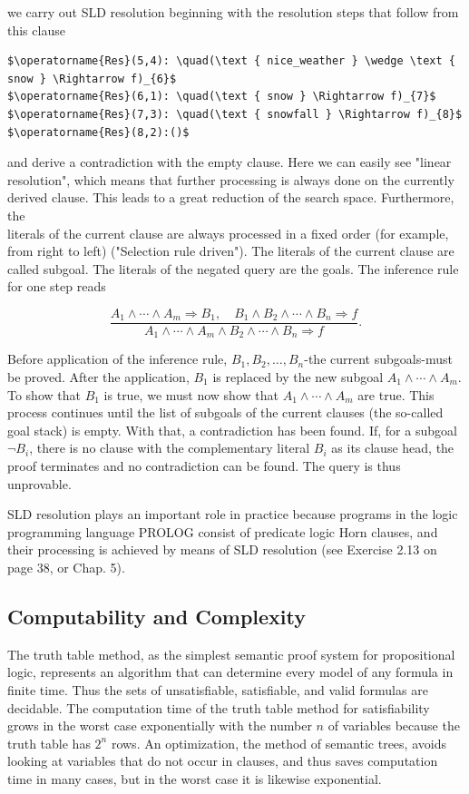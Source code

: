 \documentclass[10pt]{book}
\begin{document}
we carry out SLD resolution beginning with the resolution steps that follow from this clause

\begin{verbatim}
$\operatorname{Res}(5,4): \quad(\text { nice_weather } \wedge \text { snow } \Rightarrow f)_{6}$
$\operatorname{Res}(6,1): \quad(\text { snow } \Rightarrow f)_{7}$
$\operatorname{Res}(7,3): \quad(\text { snowfall } \Rightarrow f)_{8}$
$\operatorname{Res}(8,2):()$
\end{verbatim}

and derive a contradiction with the empty clause. Here we can easily see "linear resolution", which means that further processing is always done on the currently derived clause. This leads to a great reduction of the search space. Furthermore, the\\

literals of the current clause are always processed in a fixed order (for example, from right to left) ("Selection rule driven"). The literals of the current clause are called subgoal. The literals of the negated query are the goals. The inference rule for one step reads

$$
\frac{A_{1} \wedge \cdots \wedge A_{m} \Rightarrow B_{1}, \quad B_{1} \wedge B_{2} \wedge \cdots \wedge B_{n} \Rightarrow f}{A_{1} \wedge \cdots \wedge A_{m} \wedge B_{2} \wedge \cdots \wedge B_{n} \Rightarrow f} .
$$

Before application of the inference rule, $B_{1}, B_{2}, \ldots, B_{n}$-the current subgoals-must be proved. After the application, $B_{1}$ is replaced by the new subgoal $A_{1} \wedge \cdots \wedge A_{m}$. To show that $B_{1}$ is true, we must now show that $A_{1} \wedge \cdots \wedge A_{m}$ are true. This process continues until the list of subgoals of the current clauses (the so-called goal stack) is empty. With that, a contradiction has been found. If, for a subgoal $\neg B_{i}$, there is no clause with the complementary literal $B_{i}$ as its clause head, the proof terminates and no contradiction can be found. The query is thus unprovable.

SLD resolution plays an important role in practice because programs in the logic programming language PROLOG consist of predicate logic Horn clauses, and their processing is achieved by means of SLD resolution (see Exercise 2.13 on page 38, or Chap. 5).

\subsection*{Computability and Complexity}
The truth table method, as the simplest semantic proof system for propositional logic, represents an algorithm that can determine every model of any formula in finite time. Thus the sets of unsatisfiable, satisfiable, and valid formulas are decidable. The computation time of the truth table method for satisfiability grows in the worst case exponentially with the number $n$ of variables because the truth table has $2^{n}$ rows. An optimization, the method of semantic trees, avoids looking at variables that do not occur in clauses, and thus saves computation time in many cases, but in the worst case it is likewise exponential.
\end{document}
